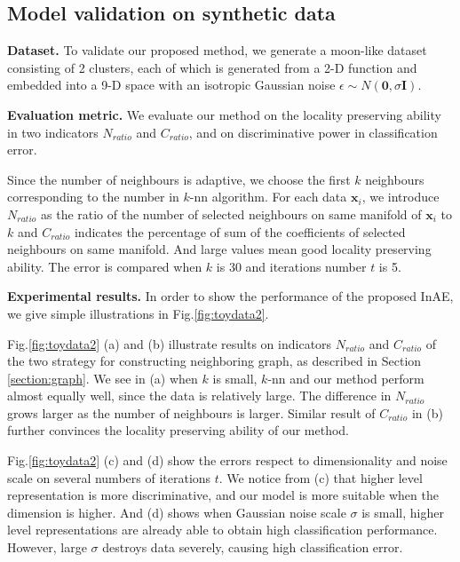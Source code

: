 \documentclass{article}
\def \x{\mathbf x}
\def \0{{\mathbf 0}}
\def \I{\mathbf I}
\begin{document}
\subsection{Model validation on synthetic data}

{\bf Dataset.}
To validate our proposed method,
we generate a moon-like dataset consisting of 2 clusters,
each of which is generated from a 2-D function
and embedded into a 9-D space with an isotropic Gaussian noise $\epsilon\sim N(\0,\sigma\I)$.

{\bf Evaluation metric.}
We evaluate our method
on the locality preserving ability in two indicators $N_{ratio}$ and $C_{ratio}$,
and on discriminative power in classification error.

Since the number of neighbours is adaptive,
we choose the first $k$ neighbours corresponding to the number in $k$-nn algorithm.
For each data $\x_i$,
we introduce $N_{ratio}$ as the ratio of the number of selected neighbours on same manifold of $\x_i$ to $k$
and $C_{ratio}$ indicates the percentage of sum of the coefficients of selected neighbours on same manifold.
And large values mean good locality preserving ability.
The error is compared when $k$ is $30$ and iterations number $t$ is 5.

{\bf Experimental results.}
In order to show the performance of the proposed InAE,
we give simple illustrations in Fig.\ref{fig:toydata2}.

Fig.\ref{fig:toydata2} (a) and (b) illustrate results on indicators $N_{ratio}$ and $C_{ratio}$ of the two strategy for constructing neighboring graph, as described in Section \ref{section:graph}.
We see in (a) when $k$ is small,
$k$-nn and our method perform almost equally well,
since the data is relatively large.
The difference in $N_{ratio}$ grows larger as the number of neighbours is larger.
Similar result of $C_{ratio}$ in (b) further convinces the locality preserving ability of our method.

Fig.\ref{fig:toydata2} (c) and (d) show the errors
respect to dimensionality and noise scale on several numbers of iterations $t$.
We notice from (c) that
higher level representation is more discriminative,
and our model is more suitable when the dimension is higher.
And (d) shows when Gaussian noise scale $\sigma$ is small,
higher level representations are already able to obtain high classification performance.
However,
large $\sigma$ destroys data severely,
causing high classification error.
\end{document}
